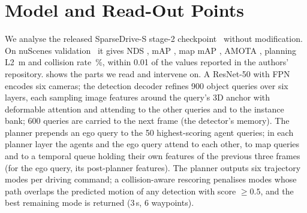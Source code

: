 \documentclass[journal]{IEEEtran}
\begin{document}
\section{Model and Read-Out Points}\label{sec:model}
We analyse the released SparseDrive-S stage-2 checkpoint~\cite{sun2024sparsedrive} without modification. On nuScenes
validation~\cite{caesar2020nuscenes} it gives NDS \NDS, mAP \mAP, map mAP \mAPmap, AMOTA \AMOTA, planning L2
\PlanLtwo\,m and collision rate \PlanCol\,\%, within 0.01 of the values reported in the authors' repository.
 shows the parts we read and intervene on. A ResNet-50 with FPN encodes six cameras; the detection
decoder refines 900 object queries over six layers, each sampling image features around the query's 3D anchor with
deformable attention and attending to the other queries and to the instance bank; 600 queries are carried to the next
frame (the detector's memory). The planner prepends an ego query to the 50 highest-scoring agent queries; in each
planner layer the agents and the ego query attend to each other, to map queries and to a temporal queue holding their
own features of the previous three frames (for the ego query, its post-planner features). The planner outputs six
trajectory modes per driving command; a collision-aware rescoring penalises modes whose path overlaps the predicted
motion of any detection with score $\geq0.5$, and the best remaining mode is returned (3\,s, 6 waypoints).
\end{document}

